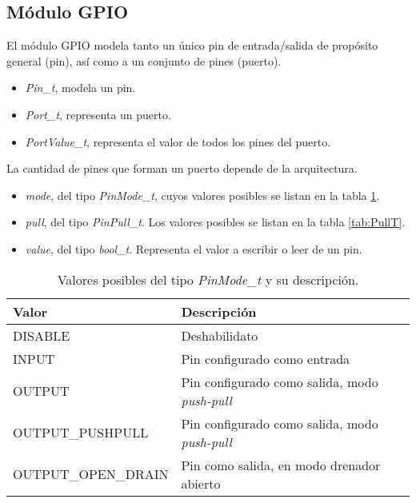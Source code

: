 \subsection{Módulo GPIO}

El módulo GPIO modela tanto un único pin de entrada/salida de propósito general (pin), así como a un conjunto de pines (puerto). 


\begin{itemize}
\item
\emph{Pin\_t}, modela un pin.
\item
\emph{Port\_t}, representa un puerto.
\item
\emph{PortValue\_t}, representa el valor de todos los pines del puerto.
\end{itemize}

La cantidad de pines que forman un puerto depende de la arquitectura.


\begin{itemize}
\item
\emph{mode}, del tipo \emph{PinMode\_t}, cuyos valores posibles se listan en la tabla \ref{tab:PinModeT}.
\item
\emph{pull}, del tipo \emph{PinPull\_t}. Los valores posibles se listan en la tabla \ref{tab:PullT}.
\item
\emph{value}, del tipo \emph{bool\_t}. Representa el valor a escribir o leer de un pin.
\end{itemize}

\begin{table}[h]
	\centering	
	\begin{tabular}{l l}   
		\toprule
		\textbf{Valor} 	    & \textbf{Descripción}  \\
		\midrule
		DISABLE	 & Deshabilidato \\		
		INPUT	    & Pin configurado como entrada	\\
		OUTPUT	 & Pin configurado como salida, modo \emph{push-pull}	\\
		OUTPUT\_PUSHPULL & Pin configurado como salida, modo \emph{push-pull}	\\
		OUTPUT\_OPEN\_DRAIN	 & Pin como salida, en modo drenador abierto	\\
		\bottomrule
		\hline
	\end{tabular}
	\caption[Valores posibles del tipo \emph{PinMode\_t}.]{Valores posibles del tipo \emph{PinMode\_t} y su descripción.}
	\label{tab:PinModeT}
\end{table}

